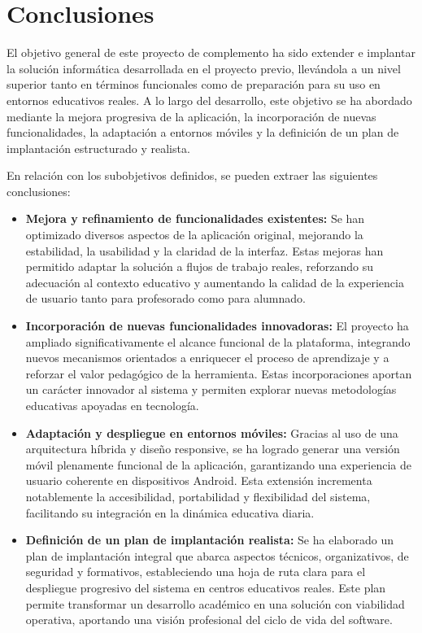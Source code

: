 \section{Conclusiones}

El objetivo general de este proyecto de complemento ha sido extender e implantar la solución informática desarrollada en el proyecto previo, llevándola a un nivel superior tanto en términos funcionales como de preparación para su uso en entornos educativos reales. A lo largo del desarrollo, este objetivo se ha abordado mediante la mejora progresiva de la aplicación, la incorporación de nuevas funcionalidades, la adaptación a entornos móviles y la definición de un plan de implantación estructurado y realista.

En relación con los subobjetivos definidos, se pueden extraer las siguientes conclusiones:

\begin{itemize}
    \item \textbf{Mejora y refinamiento de funcionalidades existentes:}  
    Se han optimizado diversos aspectos de la aplicación original, mejorando la estabilidad, la usabilidad y la claridad de la interfaz. Estas mejoras han permitido adaptar la solución a flujos de trabajo reales, reforzando su adecuación al contexto educativo y aumentando la calidad de la experiencia de usuario tanto para profesorado como para alumnado.

    \item \textbf{Incorporación de nuevas funcionalidades innovadoras:}  
    El proyecto ha ampliado significativamente el alcance funcional de la plataforma, integrando nuevos mecanismos orientados a enriquecer el proceso de aprendizaje y a reforzar el valor pedagógico de la herramienta. Estas incorporaciones aportan un carácter innovador al sistema y permiten explorar nuevas metodologías educativas apoyadas en tecnología.

    \item \textbf{Adaptación y despliegue en entornos móviles:}  
    Gracias al uso de una arquitectura híbrida y diseño responsive, se ha logrado generar una versión móvil plenamente funcional de la aplicación, garantizando una experiencia de usuario coherente en dispositivos Android. Esta extensión incrementa notablemente la accesibilidad, portabilidad y flexibilidad del sistema, facilitando su integración en la dinámica educativa diaria.
\newpage
    \item \textbf{Definición de un plan de implantación realista:}  
    Se ha elaborado un plan de implantación integral que abarca aspectos técnicos, organizativos, de seguridad y formativos, estableciendo una hoja de ruta clara para el despliegue progresivo del sistema en centros educativos reales. Este plan permite transformar un desarrollo académico en una solución con viabilidad operativa, aportando una visión profesional del ciclo de vida del software.
\end{itemize}

